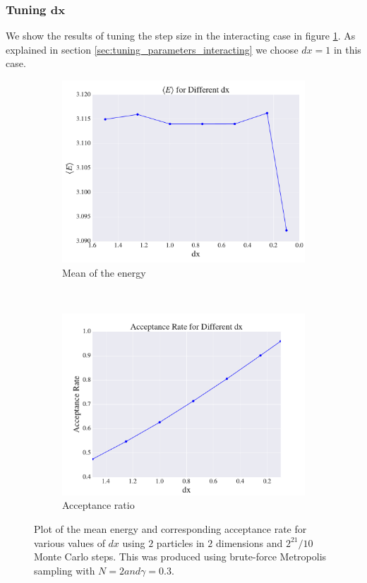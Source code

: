 \documentclass[a4paper, 10pt]{article}
\begin{document}
\subsubsection{Tuning $\boldsymbol{dx}$}
 We show the results of tuning the step size in the interacting case in figure \ref{fig:results_benchmark_no_importance_interacting}. As explained in section \ref{sec:tuning_parameters_interacting} we choose $dx=1$ in this case.\\
	 \begin{figure}[ht!]
	 	\centering
	 	\begin{subfigure}[b]{0.8\textwidth}
	 		\centering
	 		\includegraphics[width=\textwidth]{../Results/E_v_dx_normal_interacting.pdf}
	 		\caption{Mean of the energy}
	 	\end{subfigure}
	 	~
	 	\begin{subfigure}[b]{0.8\textwidth}
	 		\centering
	 		\includegraphics[width=\textwidth]{../Results/AC_normal_interacting.pdf}
	 		\caption{Acceptance ratio}
	 	\end{subfigure}
	 	\caption{Plot of the mean energy and corresponding acceptance rate for various values of $dx$ using $2$ particles in $2$ dimensions and $2^{21}/10$ Monte Carlo steps. This was produced using brute-force Metropolis sampling with $N=2 and \gamma=0.3$.}\label{fig:results_benchmark_no_importance_interacting}
	 \end{figure}\\
\end{document}
